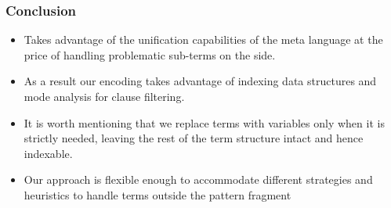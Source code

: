 \documentclass{pres}
\begin{document}
\begin{frame}
  \frametitle{Conclusion}

  \begin{itemize}
    \item Takes advantage of the unification capabilities of the meta language
          at the price of handling problematic sub-terms on the side.
    \item As a result our encoding takes advantage of indexing data structures
          and mode analysis for clause filtering.
    \item It is worth mentioning that we replace terms with variables only when
          it is strictly needed, leaving the rest of the term structure intact
          and hence indexable.
    \item Our approach is flexible enough to accommodate different strategies
          and heuristics to handle terms outside the pattern fragment
  \end{itemize}

\end{frame}
\end{document}
